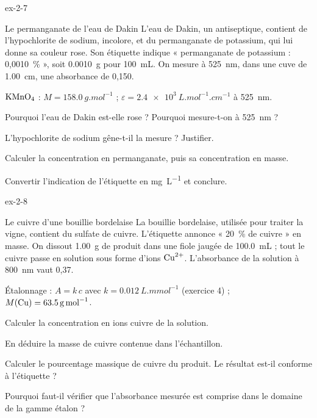 \begin{blocLivre}{ex-2-7}
\begin{exercice}[2]{Le permanganate de l'eau de Dakin}
L'eau de Dakin, un antiseptique, contient de l'hypochlorite de sodium, incolore, et du permanganate de potassium, qui lui
donne sa couleur rose. Son étiquette indique « permanganate de potassium : 0,0010~\% », soit \qty{0,0010}{g} pour \qty{100}{mL}.
On mesure à \qty{525}{nm}, dans une cuve de \qty{1,00}{cm}, une absorbance de 0,150.
\begin{donnees}
$\ce{KMnO4}$ : $M=\qty{158,0}{g.mol^{-1}}$ ; $\varepsilon=\qty{2,4e3}{L.mol^{-1}.cm^{-1}}$ à \qty{525}{nm}.
\end{donnees}
\begin{questions}
\item Pourquoi l'eau de Dakin est-elle rose ? Pourquoi mesure-t-on à \qty{525}{nm} ?
\item L'hypochlorite de sodium gêne-t-il la mesure ? Justifier.
\item Calculer la concentration en permanganate, puis sa concentration en masse.
\item Convertir l'indication de l'étiquette en \unit{mg.L^{-1}} et conclure.
\end{questions}
\end{exercice}
\end{blocLivre}
\begin{blocLivre}{ex-2-8}
\begin{exercice}[2]{Le cuivre d'une bouillie bordelaise}
La bouillie bordelaise, utilisée pour traiter la vigne, contient du sulfate de cuivre. L'étiquette annonce « 20~\% de cuivre »
en masse. On dissout \qty{1,00}{g} de produit dans une fiole jaugée de \qty{100,0}{mL} ; tout le cuivre passe en solution sous forme
d'ions $\ce{Cu^{2+}}$. L'absorbance de la solution à \qty{800}{nm} vaut 0,37.
\begin{donnees}
Étalonnage : $A=k\,c$ avec $k=\qty{0,012}{L.mmol^{-1}}$ (exercice 4) ; $M(\ce{Cu})=\qty{63,5}{g.mol^{-1}}$.
\end{donnees}
\begin{questions}
\item Calculer la concentration en ions cuivre de la solution.
\item En déduire la masse de cuivre contenue dans l'échantillon.
\item Calculer le pourcentage massique de cuivre du produit. Le résultat est-il conforme à l'étiquette ?
\item Pourquoi faut-il vérifier que l'absorbance mesurée est comprise dans le domaine de la gamme étalon ?
\end{questions}
\end{exercice}
\end{blocLivre}
